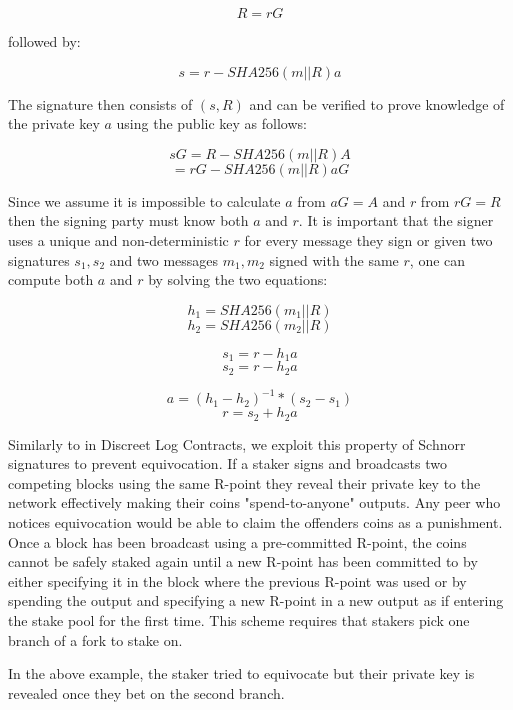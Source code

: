 \documentclass{article}
\begin{document}
$$ R = rG $$

followed by:

$$ s = r - SHA256(m || R)a $$

The signature then consists of $ (s, R) $ and can be verified to prove knowledge of the private key $ a $ using the public key as follows:

$$ sG = R - SHA256(m || R)A $$
$$ = rG - SHA256(m || R)aG$$

Since we assume it is impossible to calculate $ a $ from $ aG = A $ and $ r $ from $ rG = R $ then the signing party must know both $ a $ and $ r $. It is important that the signer uses a unique and non-deterministic $ r $ for every message they sign or given two signatures $s_1, s_2$ and two messages $m_1, m_2$ signed with the same $ r $, one can compute both $ a $ and $ r $ by solving the two equations:

$$ h_1 = SHA256(m_1 || R) $$
$$ h_2 = SHA256(m_2 || R) $$

$$ s_1 = r - h_1a $$
$$ s_2 = r - h_2a $$

$$ a = (h_1 - h_2)^{-1} * (s_2 - s_1) $$
$$ r = s_2 + h_2a$$

Similarly to in Discreet Log Contracts, we exploit this property of Schnorr signatures to prevent equivocation. If a staker signs and broadcasts two competing blocks using the same R-point they reveal their private key to the network effectively making their coins "spend-to-anyone" outputs. Any peer who notices equivocation would be able to claim the offenders coins as a punishment. Once a block has been broadcast using a pre-committed R-point, the coins cannot be safely staked again until a new R-point has been committed to by either specifying it in the block where the previous R-point was used or by spending the output and specifying a new R-point in a new output as  if entering the stake pool for the first time. This scheme requires that stakers pick one branch of a fork to stake on.

\begin{figure}[!h]
	\centering
{}
\end{figure}

In the above example, the staker tried to equivocate but their private key is revealed once they bet on the second branch.
\end{document}
